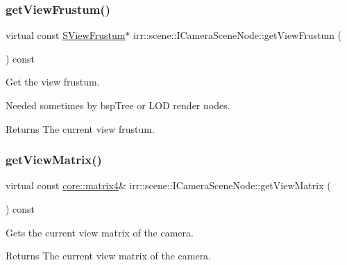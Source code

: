 \subsubsection{\texorpdfstring{get\+View\+Frustum()}{getViewFrustum()}}
{\footnotesize\ttfamily virtual const \hyperlink{structirr_1_1scene_1_1SViewFrustum}{S\+View\+Frustum}$\ast$ irr\+::scene\+::\+I\+Camera\+Scene\+Node\+::get\+View\+Frustum (\begin{DoxyParamCaption}{ }\end{DoxyParamCaption}) const\hspace{0.3cm}{\ttfamily [pure virtual]}}



Get the view frustum. 

Needed sometimes by bsp\+Tree or L\+OD render nodes. \begin{DoxyReturn}{Returns}
The current view frustum. 
\end{DoxyReturn}
\mbox{\label{classirr_1_1scene_1_1ICameraSceneNode_aef40bb2f8f4a95a66dbb7fc3abee3e49}} 
\subsubsection{\texorpdfstring{get\+View\+Matrix()}{getViewMatrix()}}
{\footnotesize\ttfamily virtual const \hyperlink{namespaceirr_1_1core_a73fa92e638c5ca97efd72da307cc9b65}{core\+::matrix4}\& irr\+::scene\+::\+I\+Camera\+Scene\+Node\+::get\+View\+Matrix (\begin{DoxyParamCaption}{ }\end{DoxyParamCaption}) const\hspace{0.3cm}{\ttfamily [pure virtual]}}



Gets the current view matrix of the camera. 

\begin{DoxyReturn}{Returns}
The current view matrix of the camera. 
\end{DoxyReturn}
\mbox{\label{classirr_1_1scene_1_1ICameraSceneNode_a033018cccdb26f94cc33256e23d764c6}} 

